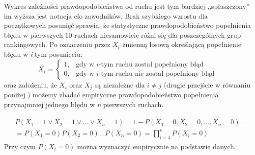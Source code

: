 \documentclass[inzynierska]{pwr_wmat_praca_dyplomowa}
\theoremstyle{plain}
\numberwithin{theorem}{chapter}
\theoremstyle{definition}
\numberwithin{theorem}{chapter}
\begin{document}
Wykres zależności prawdopodobieństwa od ruchu jest tym bardziej ,,spłaszczony'' im wyższa jest notacja elo zawodników. Brak szybkiego wzrostu dla początkowych posunięć sprawia, że statystyczne prawdopodobieństwo popełnienia błędu w pierwszych 10 ruchach niesamowicie różni się dla poszczególnych grup rankingowych.  Po oznaczeniu przez $X_i$ zmienną losową określającą popełnienie błędu w \textit{i}-tym posunięciu:
\begin{equation*}
X_i =
\begin{cases}
	1, & \text{gdy w $i$-tym ruchu został popełniony błąd}\\
	0, & \text{gdy w $i$-tym ruchu nie został popełniony błąd}
\end{cases}       
\end{equation*}
oraz założeniu, że $X_i$ oraz $X_j$ są niezależne dla $i \neq j$ (drugie przejście w równaniu poniżej \cite[str. 43]{prawdopodobienstwo_wstep}) możemy zbadać empiryczne prawdopodobieństwo popełnienia przynajmniej jednego błędu w \textit{n} pierwszych ruchach.

\begin{multline}
	\begin{split}
	& P(X_1 = 1 \vee X_2 = 1 \vee \dots \vee X_n = 1)  = 1 - P(X_1 = 0, X_2 = 0,\dots, X_n = 0) = \\
	& = P(X_1 = 0)P(X_2 = 0)\dots P(X_n = 0) = \prod_{i=1}^{n}P(X_i=0)
	\end{split}
\end{multline}
Przy czym $P(X_i=0)$ można wyznaczyć empirycznie na podstawie danych.\\
\end{document}
